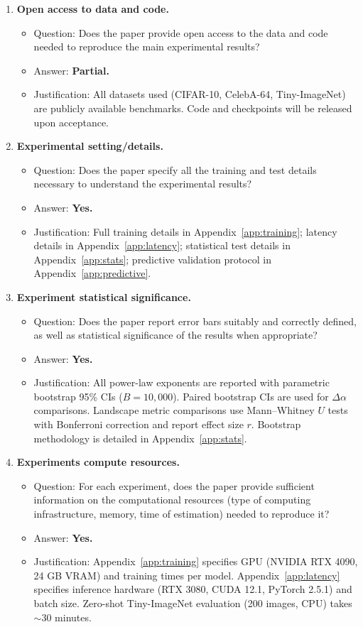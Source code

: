 \documentclass{article}
\begin{document}
\begin{enumerate}
\item \textbf{Open access to data and code.}
\begin{itemize}
  \item Question: Does the paper provide open access to the data and code needed to reproduce the main experimental results?
  \item Answer: \textbf{Partial.}
  \item Justification: All datasets used (CIFAR-10, CelebA-64, Tiny-ImageNet) are publicly available benchmarks. Code and checkpoints will be released upon acceptance.
\end{itemize}

\item \textbf{Experimental setting/details.}
\begin{itemize}
  \item Question: Does the paper specify all the training and test details necessary to understand the experimental results?
  \item Answer: \textbf{Yes.}
  \item Justification: Full training details in Appendix~\ref{app:training}; latency details in Appendix~\ref{app:latency}; statistical test details in Appendix~\ref{app:stats}; predictive validation protocol in Appendix~\ref{app:predictive}.
\end{itemize}

\item \textbf{Experiment statistical significance.}
\begin{itemize}
  \item Question: Does the paper report error bars suitably and correctly defined, as well as statistical significance of the results when appropriate?
  \item Answer: \textbf{Yes.}
  \item Justification: All power-law exponents are reported with parametric bootstrap 95\% CIs ($B{=}10{,}000$). Paired bootstrap CIs are used for $\Delta\alpha$ comparisons. Landscape metric comparisons use Mann--Whitney $U$ tests with Bonferroni correction and report effect size $r$. Bootstrap methodology is detailed in Appendix~\ref{app:stats}.
\end{itemize}

\item \textbf{Experiments compute resources.}
\begin{itemize}
  \item Question: For each experiment, does the paper provide sufficient information on the computational resources (type of computing infrastructure, memory, time of estimation) needed to reproduce it?
  \item Answer: \textbf{Yes.}
  \item Justification: Appendix~\ref{app:training} specifies GPU (NVIDIA RTX 4090, 24 GB VRAM) and training times per model. Appendix~\ref{app:latency} specifies inference hardware (RTX 3080, CUDA 12.1, PyTorch 2.5.1) and batch size. Zero-shot Tiny-ImageNet evaluation (200 images, CPU) takes $\sim$30 minutes.
\end{itemize}


\end{enumerate}
\end{document}
